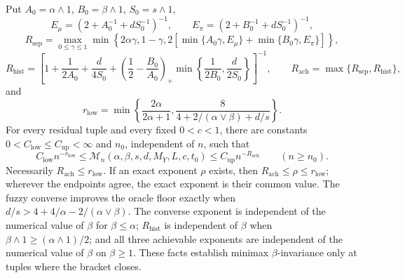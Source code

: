 Put \(A_0=\alpha\wedge1\), \(B_0=\beta\wedge1\), \(S_0=s\wedge1\),
\[
E_\mu=\left(2+A_0^{-1}+dS_0^{-1}\right)^{-1},
\qquad
E_\pi=\left(2+B_0^{-1}+dS_0^{-1}\right)^{-1},
\]
\[
R_{\mathrm{sep}}=
\max_{0\le\gamma\le1}
\min\left\{2\alpha\gamma,1-\gamma,
2\left[\min\{A_0\gamma,E_\mu\}+\min\{B_0\gamma,E_\pi\}\right]\right\},
\]
\[
R_{\mathrm{hist}}=
\left[1+\frac1{2A_0}+\frac d{4S_0}
+\left(\frac12-\frac{B_0}{A_0}\right)_+
\min\left\{\frac1{2B_0},\frac d{2S_0}\right\}
\right]^{-1},
\qquad
R_{\mathrm{ach}}=\max\{R_{\mathrm{sep}},R_{\mathrm{hist}}\},
\]
and
\[
r_{\mathrm{low}}=
\min\left\{
\frac{2\alpha}{2\alpha+1},
\frac{8}{4+2/(\alpha\vee\beta)+d/s}
\right\}.
\]
For every residual tuple and every fixed \(0<c<1\), there are constants \(0<C_{\mathrm{low}}\le C_{\mathrm{up}}<\infty\) and \(n_0\), independent of \(n\), such that
\[
C_{\mathrm{low}}n^{-r_{\mathrm{low}}}
\le
\mathcal M_n(\alpha,\beta,s,d,M_Y,L,c,t_0)
\le
C_{\mathrm{up}}n^{-R_{\mathrm{ach}}}
\qquad(n\ge n_0).
\]
Necessarily \(R_{\mathrm{ach}}\le r_{\mathrm{low}}\). If an exact exponent \(\rho\) exists, then \(R_{\mathrm{ach}}\le\rho\le r_{\mathrm{low}}\); wherever the endpoints agree, the exact exponent is their common value. The fuzzy converse improves the oracle floor exactly when \(d/s>4+4/\alpha-2/(\alpha\vee\beta)\). The converse exponent is independent of the numerical value of \(\beta\) for \(\beta\le\alpha\); \(R_{\mathrm{hist}}\) is independent of \(\beta\) when \(\beta\wedge1\ge(\alpha\wedge1)/2\); and all three achievable exponents are independent of the numerical value of \(\beta\) on \(\beta\ge1\). These facts establish minimax \(\beta\)-invariance only at tuples where the bracket closes.